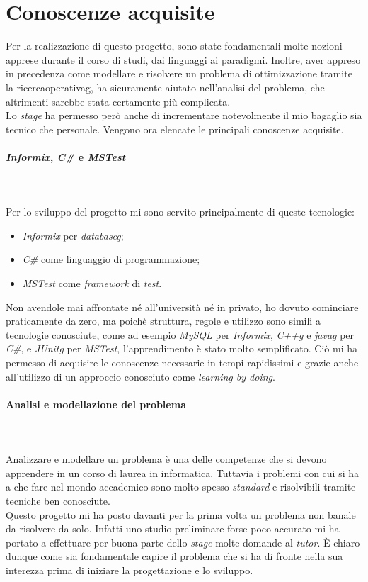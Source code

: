 \section{Conoscenze acquisite}
\label{sec:conoscenze-acquisite}
\noindent Per la realizzazione di questo progetto, sono state fondamentali
molte nozioni apprese durante il corso di studi, dai linguaggi ai paradigmi.
Inoltre, aver appreso in precedenza come modellare e risolvere un problema di ottimizzazione tramite la \gls{ricercaoperativag},
ha sicuramente aiutato nell'analisi del problema, che altrimenti sarebbe stata certamente più complicata.\\
Lo \textit{stage} ha permesso però anche di incrementare notevolmente il mio bagaglio
sia tecnico che personale.
Vengono ora elencate le principali conoscenze acquisite.
\paragraph{\textit{Informix}, \textit{C\#} e \textit{MSTest}}\hfill\\\\
\noindent Per lo sviluppo del progetto mi sono servito principalmente di queste tecnologie:
\begin{itemize}
    \item \textit{Informix} per \textit{\gls{databaseg}};
    \item \textit{C\#} come linguaggio di programmazione;
    \item \textit{MSTest} come \textit{framework} di \textit{test}.
\end{itemize}
\noindent Non avendole mai affrontate né all’università né in privato, ho dovuto
cominciare praticamente da zero, ma poichè struttura, regole e utilizzo sono simili
a tecnologie conosciute, come ad esempio \textit{MySQL} per \textit{Informix}, \textit{\gls{C++g}} e \textit{\gls{javag}} per \textit{C\#},
e \textit{\gls{JUnitg}} per \textit{MSTest}, l’apprendimento è stato molto semplificato.
Ciò mi ha permesso di acquisire le conoscenze necessarie in tempi rapidissimi
e grazie anche all'utilizzo di un approccio conosciuto come \textit{learning
by doing}.
\paragraph{Analisi e modellazione del problema}\hfill\\\\
Analizzare e modellare un problema è una delle competenze che si devono apprendere
in un corso di laurea in informatica. Tuttavia i problemi con cui si ha a che fare
nel mondo accademico sono molto spesso \textit{standard} e risolvibili tramite tecniche
ben conosciute.\\
Questo progetto mi ha posto davanti per la prima volta un problema
non banale da risolvere da solo. Infatti uno studio preliminare forse poco accurato
mi ha portato a effettuare per buona parte dello \textit{stage} molte domande al \textit{tutor}.
È chiaro dunque come sia fondamentale capire il problema che si ha di fronte nella
sua interezza prima di iniziare la progettazione e lo sviluppo.


